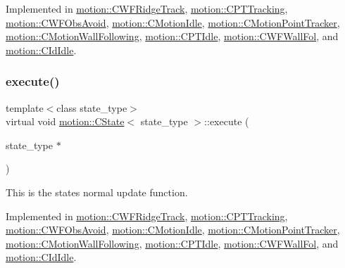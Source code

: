 Implemented in \mbox{\hyperlink{classmotion_1_1CWFRidgeTrack_a216b8b7778464a2afd1a4f57da4317de}{motion\+::\+C\+W\+F\+Ridge\+Track}}, \mbox{\hyperlink{classmotion_1_1CPTTracking_af2456aaf125ca9ba240463d1e259d4b9}{motion\+::\+C\+P\+T\+Tracking}}, \mbox{\hyperlink{classmotion_1_1CWFObsAvoid_aee2e80e821ecd29528f048c99813b63a}{motion\+::\+C\+W\+F\+Obs\+Avoid}}, \mbox{\hyperlink{classmotion_1_1CMotionIdle_adf54cf3d93e54060a3060017e55ea706}{motion\+::\+C\+Motion\+Idle}}, \mbox{\hyperlink{classmotion_1_1CMotionPointTracker_a77975b88cc198d7115910dd0e738f925}{motion\+::\+C\+Motion\+Point\+Tracker}}, \mbox{\hyperlink{classmotion_1_1CMotionWallFollowing_ad42584f648abe8826d2c23dad8128484}{motion\+::\+C\+Motion\+Wall\+Following}}, \mbox{\hyperlink{classmotion_1_1CPTIdle_ad77ab399843dcf692d683747dbf51dd4}{motion\+::\+C\+P\+T\+Idle}}, \mbox{\hyperlink{classmotion_1_1CWFWallFol_a4d0e6d05a5bc89c690f86559cbc55ecb}{motion\+::\+C\+W\+F\+Wall\+Fol}}, and \mbox{\hyperlink{classmotion_1_1CIdIdle_a14a7339e10f93b2725b6edfb66583ca7}{motion\+::\+C\+Id\+Idle}}.

\mbox{\label{classmotion_1_1CState_a71dc72d345b15bf3b5b5bff596a71f33}} 
\subsubsection{\texorpdfstring{execute()}{execute()}}
{\footnotesize\ttfamily template$<$class state\+\_\+type$>$ \\
virtual void \mbox{\hyperlink{classmotion_1_1CState}{motion\+::\+C\+State}}$<$ state\+\_\+type $>$\+::execute (\begin{DoxyParamCaption}\item[{state\+\_\+type $\ast$}]{ }\end{DoxyParamCaption})\hspace{0.3cm}{\ttfamily [pure virtual]}}

This is the states normal update function. 

Implemented in \mbox{\hyperlink{classmotion_1_1CWFRidgeTrack_a68b351694d461637ad97c5d657f3fbca}{motion\+::\+C\+W\+F\+Ridge\+Track}}, \mbox{\hyperlink{classmotion_1_1CPTTracking_aa8f85da75436cc8d98c25318b0bea42d}{motion\+::\+C\+P\+T\+Tracking}}, \mbox{\hyperlink{classmotion_1_1CWFObsAvoid_a458771fccc326a8b02e4f947cdbb7f3b}{motion\+::\+C\+W\+F\+Obs\+Avoid}}, \mbox{\hyperlink{classmotion_1_1CMotionIdle_aad314bae00925e2fdbbf8e93fff08b9a}{motion\+::\+C\+Motion\+Idle}}, \mbox{\hyperlink{classmotion_1_1CMotionPointTracker_a2513b0d052536d307db674af8ee8a3e6}{motion\+::\+C\+Motion\+Point\+Tracker}}, \mbox{\hyperlink{classmotion_1_1CMotionWallFollowing_a765cfe604941a06056131feb01fea66d}{motion\+::\+C\+Motion\+Wall\+Following}}, \mbox{\hyperlink{classmotion_1_1CPTIdle_af41acb6cf867df293faf85bfbff91940}{motion\+::\+C\+P\+T\+Idle}}, \mbox{\hyperlink{classmotion_1_1CWFWallFol_a089095864c2340123e6e5e5e4e08ef23}{motion\+::\+C\+W\+F\+Wall\+Fol}}, and \mbox{\hyperlink{classmotion_1_1CIdIdle_a157fe57e41c2a53bb5bbd444a74636bd}{motion\+::\+C\+Id\+Idle}}.

